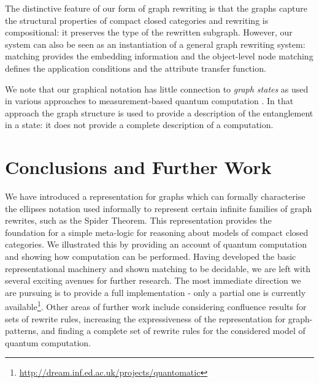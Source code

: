 \documentclass[runningheads]{llncs}
\begin{document}
The distinctive feature of our form of graph rewriting is that the
graphs capture the structural properties of compact closed categories
and rewriting is compositional: it preserves the type of the rewritten
subgraph. However, our system can also be seen as an instantiation of
a general graph rewriting system: matching provides the embedding
information and the object-level node matching defines the application
conditions and the attribute transfer function.

We note that our graphical notation has little connection
to \emph{graph states} as used in various approaches to
measurement-based quantum computation \cite{Raussendorf-2001}.  In
that approach the graph structure is used to provide a description of
the entanglement in a state:  it does not provide a complete
description of a computation.


\section{Conclusions and Further Work}
\label{sec:conclusions}

We have introduced a representation for graphs which can formally
characterise the ellipses notation used informally to represent
certain infinite families of graph rewrites, such as the Spider
Theorem.  This representation provides the foundation for a simple
meta-logic for reasoning about models of compact closed categories. We
illustrated this by providing an account of quantum computation and
showing how computation can be performed. Having developed the basic
representational machinery and shown matching to be decidable, we are
left with several exciting avenues for further research.  The most
immediate direction we are pursuing is to provide a full
implementation - only a partial one is currently
available\footnote{\url{http://dream.inf.ed.ac.uk/projects/quantomatic}}.
Other areas of further work include considering confluence results for
sets of rewrite rules, increasing the expressiveness of the
representation for graph-patterns, and finding a complete set of
rewrite rules for the considered model of quantum computation.




\end{document}
